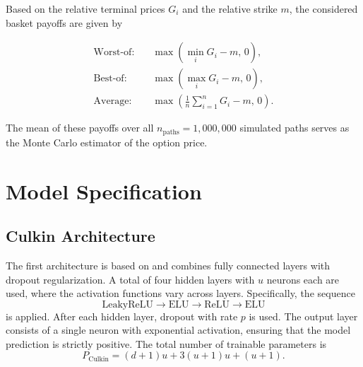 Based on the relative terminal prices $G_i$ and the relative strike $m$, the considered basket payoffs are given by

\begin{align}
\text{Worst-of:} \quad &
\max\!\left(\min_{i} G_i - m,\, 0\right), \\
\text{Best-of:} \quad &
\max\!\left(\max_{i} G_i - m,\, 0\right), \\
\text{Average:} \quad &
\max\!\left(\frac{1}{n}\sum_{i=1}^{n} G_i - m,\, 0\right).
\end{align}

The mean of these payoffs over all $n_{\text{paths}} = 1{,}000{,}000$ simulated paths serves as the Monte Carlo estimator of the option price.



\section{Model Specification}

\subsection{Culkin Architecture}
\label{sec:mt-culkin}

The first architecture is based on \cite{culkin2017machine} and combines fully connected layers with dropout regularization.
A total of four hidden layers with $u$ neurons each are used, where the activation functions vary across layers. Specifically, the sequence
\[
\text{LeakyReLU} \rightarrow \text{ELU} \rightarrow \text{ReLU} \rightarrow \text{ELU}
\]
is applied. After each hidden layer, dropout with rate $p$ is used.
The output layer consists of a single neuron with exponential activation, ensuring that the model prediction is strictly positive. The total number of trainable parameters is
\begin{equation}
\label{eq:params_culkin}
P_{\text{Culkin}}
=
(d+1)u
+ 3(u+1)u
+ (u+1).
\end{equation}

